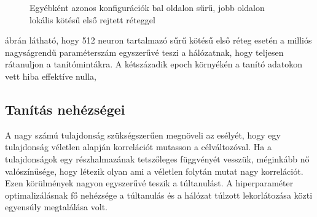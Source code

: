 \begin{figure}[H]
    
		\begin{subfigure}{\linewidth}
		\centering
		\end{subfigure}
	\caption{Egyébként azonos konfigurációk bal oldalon sűrű, jobb oldalon lokális kötésű első rejtett réteggel  \label{densevslocal}}
\end{figure}

 ábrán látható, hogy 512 neuron tartalmazó sűrű kötésű első réteg esetén a milliós nagyságrendű paraméterszám egyszerűvé teszi a hálózatnak, hogy teljesen rátanuljon a tanítómintákra. A kétszázadik epoch környékén a tanító adatokon vett hiba effektíve nulla, 

\subsection{Tanítás nehézségei}

A nagy számú tulajdonság szükségszerűen megnöveli az esélyét, hogy egy tulajdonság véletlen alapján korrelációt mutasson a célváltozóval. Ha a tulajdonságok egy részhalmazának tetszőleges függvényét vesszük, méginkább nő valószínűsége, hogy létezik olyan ami a véletlen folytán mutat nagy korrelációt. Ezen körülmények nagyon egyszerűvé teszik a túltanulást. A hiperparaméter optimalizálásnak fő nehézsége a túltanulás és a hálózat túlzott lekorlátozása közti egyensúly megtalálása volt.

